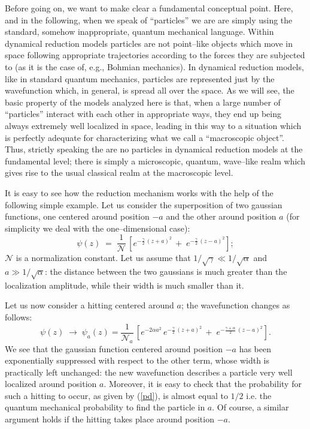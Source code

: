 \documentclass[10pt,a4paper]{article}
\begin{document}
Before going on, we want to make clear a fundamental conceptual
point. Here, and in the following, when we speak of ``particles''
we are are simply using the standard, somehow inappropriate,
quantum mechanical language. Within dynamical reduction models
particles are not point--like objects which move in space
following appropriate trajectories according to the forces they
are subjected to (as it is the case of, e.g., Bohmian mechanics).
In dynamical reduction models, like in standard quantum mechanics,
particles are represented just by the wavefunction which, in
general, is spread all over the space. As we will see, the basic
property of the models  analyzed here is that, when a large number
of ``particles'' interact with each other in appropriate ways,
they end up being always extremely well localized in space,
leading in this way to a situation which is perfectly adequate for
characterizing what we call a ``macroscopic object''. Thus,
strictly speaking \cite{bells} the are no particles in dynamical
reduction models at the fundamental level; there is simply a
microscopic, quantum, wave--like realm which gives rise to the
usual classical realm at the macroscopic level.

It is easy to see how the reduction mechanism works with the help
of the following simple example. Let us consider the superposition
of two gaussian functions, one centered around position $-a$ and
the other around position $a$ (for simplicity we deal with the
one--dimensional case):
\begin{equation}
\psi(z) \; = \; \frac{1}{\mathcal N}\, \left[ e^{\displaystyle
-\frac{\gamma}{2}\, (z + a)^{2}} \, + \; e^{\displaystyle
-\frac{\gamma}{2}\, (z - a)^{2}} \right];
\end{equation}
${\mathcal N}$ is a normalization constant. Let us assume that
$1/\sqrt{\gamma} \ll 1/\sqrt{\alpha}$ and $a \gg 1/\sqrt{\alpha}$:
the distance between the two gaussians is much greater than the
localization amplitude, while their width is much smaller than it.

Let us now consider a hitting centered around $a$; the
wavefunction changes as follows:
\begin{equation}
\psi(z) \; \longrightarrow \; \psi_{a}(z) = \frac{1}{{\mathcal
N}_{a}}\, \left[e^{\displaystyle -2\alpha a^{2}}\,
e^{\displaystyle -\frac{\gamma}{2}\, (z + a)^{2}} \, + \;
e^{\displaystyle -\frac{\gamma + \alpha}{2}\, (z - a)^{2}}
\right].
\end{equation}
We see that the gaussian function centered around position $-a$
has been exponentially suppressed with respect to the other term,
whose width is practically left unchanged: the new wavefunction
describes a particle very well localized around position $a$.
Moreover, it is easy to check that the probability for such a
hitting to occur, as given by (\ref{pd}), is almost equal to $1/2$
i.e. the quantum mechanical probability to find the particle in
$a$. Of course, a similar argument holds if the hitting takes
place around position $-a$.
\end{document}
